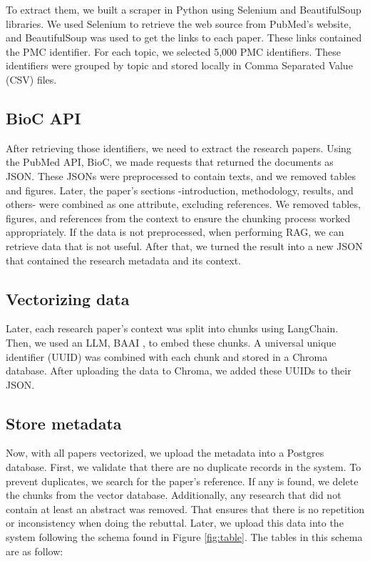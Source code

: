 To extract them, we built a scraper in Python using Selenium and BeautifulSoup libraries. We used Selenium to retrieve the web source from PubMed's website, and BeautifulSoup was used to get the links to each paper. These links contained the PMC identifier. For each topic, we selected 5,000 PMC identifiers. These identifiers were grouped by topic and stored locally in Comma Separated Value (CSV) files.

\subsection{BioC API}
After retrieving those identifiers, we need to extract the research papers. Using the PubMed API, BioC, we made requests that returned the documents as JSON. These JSONs were preprocessed to contain texts, and we removed tables and figures. Later, the paper's sections -introduction, methodology, results, and others- were combined as one attribute, excluding references. We removed tables, figures, and references from the context to ensure the chunking process worked appropriately. If the data is not preprocessed, when performing RAG, we can retrieve data that is not useful. After that, we turned the result into a new JSON that contained the research metadata and its context. 

\subsection{Vectorizing data}
Later, each research paper’s context was split into chunks using LangChain. Then, we used an LLM, BAAI \cite{bge_embedding}, to embed these chunks. A universal unique identifier (UUID) was combined with each chunk and stored in a Chroma \cite{chroma} database. After uploading the data to Chroma, we added these UUIDs to their JSON. 


\subsection{Store metadata}
Now, with all papers vectorized, we upload the metadata into a Postgres database. First, we validate that there are no duplicate records in the system. To prevent duplicates, we search for the paper's reference. If any is found, we delete the chunks from the vector database. Additionally, any research that did not contain at least an abstract was removed. That ensures that there is no repetition or inconsistency when doing the rebuttal. Later, we upload this data into the system following the schema found in Figure \ref{fig:table}. The tables in this schema are as follow:

